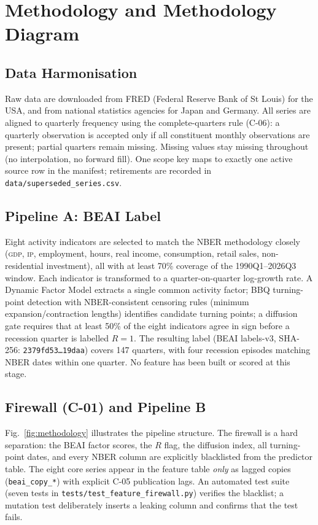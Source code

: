 \documentclass[conference]{IEEEtran}
\begin{document}
\section{Methodology and Methodology Diagram}

\subsection{Data Harmonisation}

Raw data are downloaded from FRED (Federal Reserve Bank of St Louis) for the USA,
and from national statistics agencies for Japan and Germany.
All series are aligned to quarterly frequency using the complete-quarters rule (C-06):
a quarterly observation is accepted only if all constituent monthly observations are
present; partial quarters remain missing. Missing values stay missing throughout
(no interpolation, no forward fill). One scope key maps to exactly one active source
row in the manifest; retirements are recorded in \texttt{data/superseded\_series.csv}.

\subsection{Pipeline A: BEAI Label}

Eight activity indicators are selected to match the NBER methodology closely
(\textsc{gdp}, \textsc{ip}, employment, hours, real income,
consumption, retail sales, non-residential investment), all with at least 70\%
coverage of the 1990Q1--2026Q3 window. Each indicator is transformed to a
quarter-on-quarter log-growth rate. A Dynamic Factor Model extracts a single
common activity factor; BBQ turning-point detection with NBER-consistent censoring
rules (minimum expansion/contraction lengths) identifies candidate turning points;
a diffusion gate requires that at least 50\% of the eight indicators agree in sign
before a recession quarter is labelled $R=1$. The resulting label (BEAI labels-v3,
SHA-256: \texttt{2379fd53\ldots19daa}) covers 147 quarters, with four recession
episodes matching NBER dates within one quarter. No feature has been built or
scored at this stage.

\subsection{Firewall (C-01) and Pipeline B}

Fig.~\ref{fig:methodology} illustrates the pipeline structure. The firewall is a
hard separation: the BEAI factor scores, the $R$ flag, the diffusion index, all
turning-point dates, and every NBER column are explicitly blacklisted from the
predictor table. The eight core series appear in the feature table \emph{only} as
lagged copies (\texttt{beai\_copy\_*}) with explicit C-05 publication lags.
An automated test suite (seven tests in \texttt{tests/test\_feature\_firewall.py})
verifies the blacklist; a mutation test deliberately inserts a leaking column and
confirms that the test fails.
\end{document}
